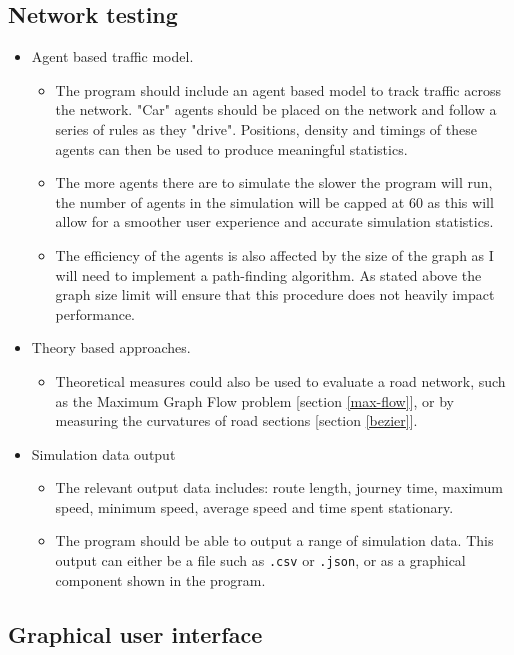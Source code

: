     \subsection{Network testing}
    \begin{itemize}
        \item Agent based traffic model.
        \begin{itemize}
            \item The program should include an agent based model to track traffic across the network. "Car" agents should be placed on the network and follow a series of rules as they "drive". Positions, density and timings of these agents can then be used to produce meaningful statistics.
            \item The more agents there are to simulate the slower the program will run, the number of agents in the simulation will be capped at 60 as this will allow for a smoother user experience and accurate simulation statistics.
            \item The efficiency of the agents is also affected by the size of the graph as I will need to implement a path-finding algorithm. As stated above the graph size limit will ensure that this procedure does not heavily impact performance.
        \end{itemize}
        \item Theory based approaches.
        \begin{itemize}
            \item Theoretical measures could also be used to evaluate a road network, such as the Maximum Graph Flow problem [section \ref{max-flow}], or by measuring the curvatures of road sections [section \ref{bezier}].
        \end{itemize}
        \item Simulation data output
        \begin{itemize}
            \item The relevant output data includes: route length, journey time, maximum speed, minimum speed, average speed and time spent stationary.
            \item The program should be able to output a range of simulation data. This output can either be a file such as \texttt{.csv} or \texttt{.json}, or as a graphical component shown in the program.
        \end{itemize}
    \end{itemize}

    \subsection{Graphical user interface}
    \label{requirements-GUI}


